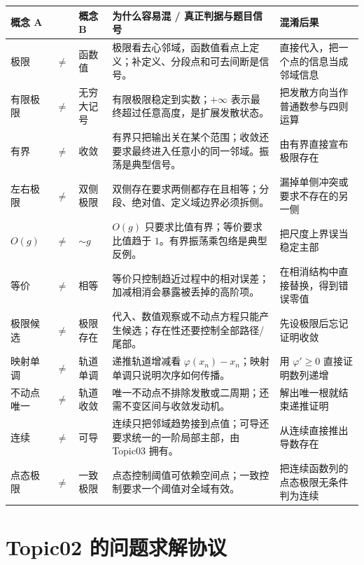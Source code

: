 \documentclass[11pt,a4paper]{ctexart}
\begin{document}
\begin{longtable}{L{1.95cm}@{}>{\centering\arraybackslash}p{0.35cm}@{}L{1.95cm}L{5.55cm}L{\dimexpr\linewidth-10.15cm\relax}}
\toprule
\textbf{概念 A} & & \textbf{概念 B} & \textbf{为什么容易混 / 真正判据与题目信号} & \textbf{混淆后果}\\
\midrule
极限 & $\neq$ & 函数值 & 极限看去心邻域，函数值看点上定义；补定义、分段点和可去间断是信号。 & 直接代入，把一个点的信息当成邻域信息\\
有限极限 & $\neq$ & 无穷大记号 & 有限极限稳定到实数；$+\infty$ 表示最终超过任意高度，是扩展发散状态。 & 把发散方向当作普通数参与四则运算\\
有界 & $\neq$ & 收敛 & 有界只把输出关在某个范围；收敛还要求最终进入任意小的同一邻域。振荡是典型信号。 & 由有界直接宣布极限存在\\
左右极限 & $\neq$ & 双侧极限 & 双侧存在要求两侧都存在且相等；分段、绝对值、定义域边界必须拆侧。 & 漏掉单侧冲突或要求不存在的另一侧\\
$O(g)$ & $\neq$ & $\sim g$ & $O(g)$ 只要求比值有界；等价要求比值趋于 $1$。有界振荡乘包络是典型反例。 & 把尺度上界误当稳定主部\\
等价 & $\neq$ & 相等 & 等价只控制趋近过程中的相对误差；加减相消会暴露被丢掉的高阶项。 & 在相消结构中直接替换，得到错误零值\\
极限候选 & $\neq$ & 极限存在 & 代入、数值观察或不动点方程只能产生候选；存在性还要控制全部路径/尾部。 & 先设极限后忘记证明收敛\\
映射单调 & $\neq$ & 轨道单调 & 递推轨道增减看 $\varphi(x_n)-x_n$；映射单调只说明次序如何传播。 & 用 $\varphi'\ge0$ 直接证明数列递增\\
不动点唯一 & $\neq$ & 轨道收敛 & 唯一不动点不排除发散或二周期；还需不变区间与收敛发动机。 & 解出唯一根就结束递推证明\\
连续 & $\neq$ & 可导 & 连续只把邻域趋势接到点值；可导还要求统一的一阶局部主部，由 Topic03 拥有。 & 从连续直接推出导数存在\\
点态极限 & $\neq$ & 一致极限 & 点态控制阈值可依赖空间点；一致控制要求一个阈值对全域有效。 & 把连续函数列的点态极限无条件判为连续\\
\bottomrule
\end{longtable}

\section{Topic02 的问题求解协议}
\end{document}
